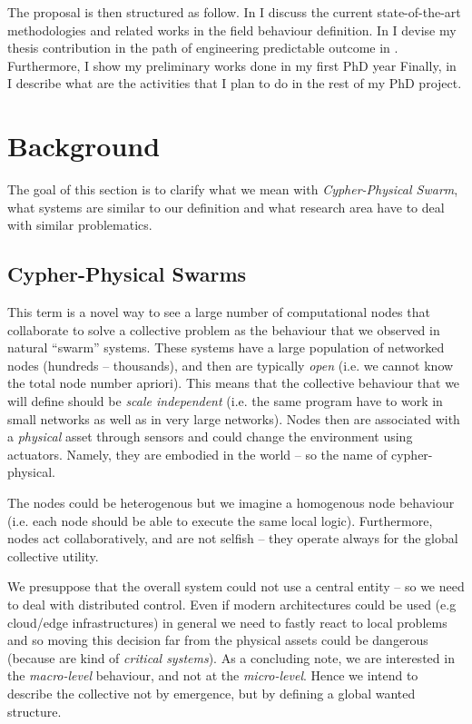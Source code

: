\documentclass[11pt]{article}
\begin{document}
The proposal is then structured as follow. In  I discuss the current state-of-the-art methodologies and related works in the field \cpsw{} behaviour definition.
%
In  I devise my thesis contribution in the path of engineering predictable outcome in \cpsw{}. Furthermore, I show my preliminary works done in my first PhD year
%
Finally, in  I describe what are the activities that I plan to do in the rest of my PhD project.

\section{Background} \label{background}
The goal of this section is to clarify what we mean with \textit{Cypher-Physical Swarm}, what systems are similar to our definition and what research area have to deal with similar problematics.
\subsection{Cypher-Physical Swarms}
This term is a novel way to see a large number of computational nodes that collaborate to solve a collective problem as the behaviour that we observed in natural ``swarm'' systems.
%
These systems have a large population of networked nodes (hundreds -- thousands), and then are typically \textit{open} (i.e. we cannot know the total node number apriori). This means that the collective behaviour that we will define should be \textit{scale independent} (i.e. the same program have to work in small networks as well as in very large networks).
%
Nodes then are associated with a \textit{physical} asset through sensors and could change the environment using actuators. Namely, they are embodied in the world -- so the name of cypher-physical. 


The nodes could be heterogenous but we imagine a homogenous node behaviour (i.e. each node should be able to execute the same local logic). Furthermore, nodes act collaboratively, and are not selfish -- they operate always for the global collective utility.

We presuppose that the overall system could not use a central entity -- so we need to deal with distributed control. Even if modern architectures could be used (e.g cloud/edge infrastructures) in general we need to fastly react to local problems and so moving this decision far from the physical assets could be dangerous (because are kind of \emph{critical systems}).
As a concluding note, we are interested in the \textit{macro-level} behaviour, and not at the \textit{micro-level}. Hence we intend to describe the collective not by emergence, but by defining a global wanted structure.
\end{document}
